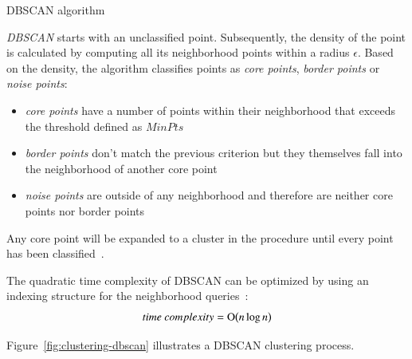 \begin{algorithm}[t]
  \caption{DBSCAN algorithm~\cite{Meert06clustermaps}}
  \label{alg:dbscan}
\end{algorithm}

\textit{DBSCAN} starts with an unclassified point. Subsequently, the density of the point is calculated by computing all its neighborhood points within a radius $\epsilon$. Based on the density, the algorithm classifies points as \textit{core points}, \textit{border points} or \textit{noise points}:

\begin{itemize}
\item \textit{core points} have a number of points within their neighborhood that exceeds the threshold defined as $MinPts$
\item \textit{border points} don't match the previous criterion but they themselves fall into the neighborhood of another core point
\item \textit{noise points} are outside of any neighborhood and therefore are neither core points nor border points
\end{itemize}

Any core point will be expanded to a cluster in the procedure until every point has been classified~\cite{Varlaro08spatial, Meert06clustermaps}.

The quadratic time complexity of DBSCAN  can be optimized by using an indexing structure for the neighborhood queries~\cite{wiki:DBSCAN}:
\[time~complexity = \operatorname{O}\bigl(n \log{n} \bigr)\]

Figure~\ref{fig:clustering-dbscan} illustrates a DBSCAN clustering process.


